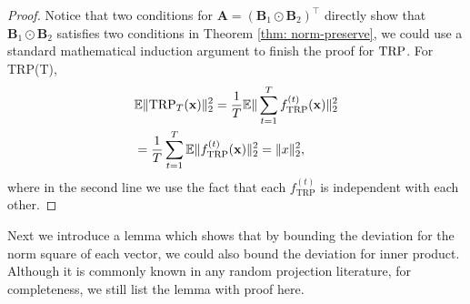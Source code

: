 \begin{proof}
Notice that two conditions for $\mathbf{A}  =  (\mathbf{B}_1 \odot\mathbf{B}_2 )^\top$ directly show that $\mathbf{B}_1 \odot\mathbf{B}_2$ satisfies two conditions in Theorem \ref{thm: norm-preserve}, we could use a standard mathematical induction argument to finish the proof for $\textup{TRP}$. For TRP(T), 
\begin{equation}
\begin{aligned}
&\mathbb{E}\|\textup{TRP}_T(\mathbf{x})\|^2_2=\frac{1}{T} \mathbb{E}\|\sum_{t=1}^T f^{(t)}_{\text{TRP}}(\mathbf{x})\|^2_2\\
&= \frac{1}{T}\sum_{t=1}^T\mathbb{E} \|f^{(t)}_{\text{TRP}}(\mathbf{x})\|^2_2= \|x\|^2_2,
\nonumber 
\end{aligned}
\end{equation}
where in the second line we use the fact that each $f^{(t)}_{\text{TRP}}$ is independent with each other.
\end{proof}


Next we introduce a lemma which shows that by bounding the deviation for the norm square of each vector, we could also bound the deviation for inner product. Although it is commonly known in any random projection literature, for completeness, we still list the lemma with proof here. 




